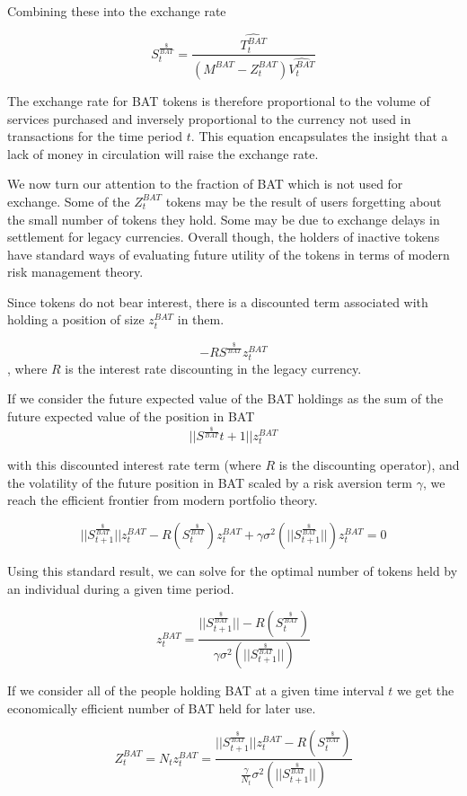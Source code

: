 \documentclass[11pt]{article}
\begin{document}
Combining these into the exchange rate

\[ \tag{1} S^{\frac{\$}{BAT}}_{t} = \frac{\widehat{T^{BAT}_{t}}}{(M^{BAT} - Z^{BAT}_{t} ) \widehat{V^{BAT}_{t}}} \]

The exchange rate for BAT tokens is therefore proportional to the
volume of services purchased and inversely proportional to the
currency not used in transactions for the time period $t$. This equation
encapsulates the insight that a lack of money in circulation will
raise the exchange rate.

We now turn our attention to the fraction of BAT which is not used for
exchange. Some of the $Z^{BAT}_{t}$ tokens may
be the result of users forgetting about the small number of tokens
they hold. Some may be due to exchange delays in settlement for legacy
currencies. Overall though, the holders of inactive tokens have
standard ways of evaluating future utility of the tokens in terms of
modern risk management theory.

Since tokens do not bear interest, there is a discounted term
associated with holding a position of size  $z^{BAT}_{t}$ in them.

\[ -R S^{\frac{\$}{BAT}} z^{BAT}_{t} \], where $R$ is the
interest rate discounting in the legacy currency.

If we consider the future expected value of the BAT holdings as the
sum of the future expected value of the position in  BAT
\[ ||S^{\frac{\$}{BAT}}{t+1}|| z^{BAT}_{t}\]

with this discounted interest rate term (where $R$ is the discounting operator),
and the volatility of the future position in BAT scaled by a risk
aversion term $\gamma$, we reach the efficient frontier from modern portfolio
theory.

\[ ||S^{\frac{\$}{BAT}}_{t+1}|| z^{BAT}_{t} -R (S^{\frac{\$}{BAT}}_{t}) z^{BAT}_{t} + \gamma \sigma^{2}(||S^{\frac{\$}{BAT}}_{t+1}||) z^{BAT}_{t} =0\]

Using this standard result, we can solve for the optimal number of
tokens held by an individual during a given time period.

\[ z^{BAT}_{t} =\frac{||S^{\frac{\$}{BAT}}_{t+1}|| -R( S^{\frac{\$}{BAT}}_{t})}{ \gamma \sigma^{2}(||S^{\frac{\$}{BAT}}_{t+1}||) } \]

If we consider all of the people holding BAT at a given time interval $t$
we get the economically efficient number of BAT held for later use.

\[ Z^{BAT}_{t} = N_{t} z^{BAT}_{t} =\frac{||S^{\frac{\$}{BAT}}_{t+1}|| z^{BAT}_{t} -R(S^{\frac{\$}{BAT}}_{t})}{ \frac{\gamma}{N_{t}} \sigma^{2}(||S^{\frac{\$}{BAT}}_{t+1}||) } \]
\end{document}
